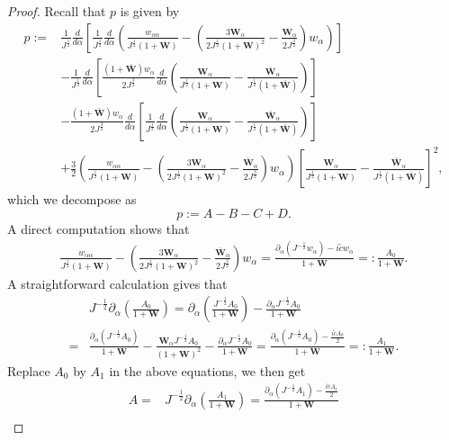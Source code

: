 \documentclass[10pt]{amsart}
\theoremstyle{remark}
\theoremstyle{definition}
\numberwithin{equation}{section}
\newcommand{\p}{\partial}
\newcommand{\al}{\alpha}
\newcommand{\f}{\frac}
\begin{document}
\begin{proof}
Recall that $p$ is given by
\begin{align*}
p:=&\f{1}{J^{\f12}}\f{d}{d\al}\left[\f{1}{J^{\f12}}\f{d}{d\al}\left(\f{w_{\al\al}}{J^{\f12}(1+\mathbf{W})}-\left(\f{3\mathbf{W}_{\al}}{2J^{\f12}(1+\mathbf{W})^2}-\f{\mathbf{W}_{\al}}{2J^{\f32}}\right)w_{\al}\right)\right]\\
&-\f{1}{J^{\f12}}\f{d}{d\al}\left[\frac{(1+\bar{\mathbf{W}})w_{\al}}{2J^{\f32}}\f{d}{d\al}\left(\f{\mathbf{W}_{\al}}{J^{\f12}(1+\mathbf{W})}-\f{\bar{\mathbf{W}}_{\al}}{J^{\f12}(1+\bar{\mathbf{W}})}
\right)\right]\\
&-\frac{(1+\bar{\mathbf{W}})w_{\al}}{2J^{\f32}}\f{d}{d\al}\left[\f{1}{J^{\f12}}\f{d}{d\al}\left(\f{\mathbf{W}_{\al}}{J^{\f12}(1+\mathbf{W})}-\f{\bar{\mathbf{W}}_{\al}}{J^{\f12}(1+\bar{\mathbf{W}})}
\right)\right]\\
&+\f32\left(\f{w_{\al\al}}{J^{\f12}(1+\mathbf{W})}-\left(\f{3\mathbf{W}_{\al}}{2J^{\f12}(1+\mathbf{W})^2}-\f{\bar{\mathbf{W}}_{\al}}{2J^{\f32}}\right)w_{\al}\right)\left[\f{\mathbf{W}_{\al}}{J^{\f12}(1+\mathbf{W})}
-\f{\bar{\mathbf{W}}_{\al}}{J^{\f12}(1+\bar{\mathbf{W}})}\right]^2,
\end{align*}
which we decompose as
\begin{equation*}
   p :=A-B-C+D.
\end{equation*}
A direct computation shows that
\begin{align*}
\f{w_{\al\al}}{J^{\f12}(1+\mathbf{W})}-\left(\f{3\mathbf{W}_{\al}}{2J^{\f12}(1+\mathbf{W})^2}-\f{\bar{\mathbf{W}}_{\al}}{2J^{\f32}}\right)w_{\al}=\f{\p_{\al}(J^{-\f12}w_{\al})-i\tilde{c}w_{\al}}{1+\mathbf{W}}=:\f{A_0}{1+\mathbf{W}}.
\end{align*}
A straightforward calculation gives that
\begin{align*}
&J^{-\f12}\p_{\al}\left(\frac{A_0}{1+\mathbf{W}}\right)=\p_{\al}\left(\frac{J^{-\f12}A_0}{1+\mathbf{W}}\right)
-\frac{\p_{\al}J^{-\f12}A_0}{1+\mathbf{W}}\\
=&\frac{\p_{\al}\left(J^{-\f12}A_0\right)}{1+\mathbf{W}}-\f{\mathbf{W}_{\al}J^{-\f12}A_0}{(1+\mathbf{W})^2}
-\frac{\p_{\al}J^{-\f12}A_0}{1+\mathbf{W}}
=\f{\p_{\al}(J^{-\f12}A_0)-\f{i\tilde{c}A_0}{2}}{1+\mathbf{W}}=:\f{A_1}{1+\mathbf{W}}.
\end{align*}
Replace $A_0$ by $A_1$ in the above equations, we then get
\begin{align*}
A=&J^{-\f12}\p_{\al}\left(\frac{A_1}{1+\mathbf{W}}\right)=\f{\p_{\al}(J^{-\f12}A_1)-\f{i\tilde{c}A_1}{2}}{1+\mathbf{W}}\\

\end{align*}
\end{proof}
\end{document}
